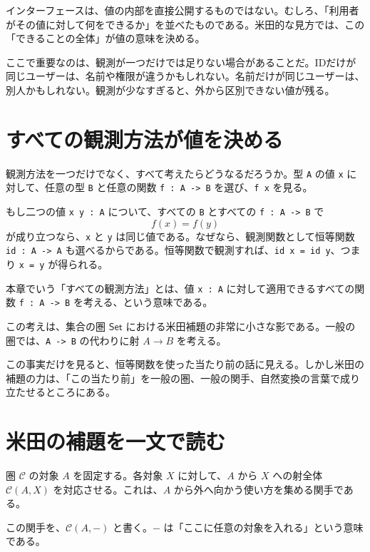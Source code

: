 \begin{softwarebox}
インターフェースは、値の内部を直接公開するものではない。むしろ、「利用者がその値に対して何をできるか」を並べたものである。米田的な見方では、この「できることの全体」が値の意味を決める。
\end{softwarebox}

ここで重要なのは、観測が一つだけでは足りない場合があることだ。IDだけが同じユーザーは、名前や権限が違うかもしれない。名前だけが同じユーザーは、別人かもしれない。観測が少なすぎると、外から区別できない値が残る。

\section{すべての観測方法が値を決める}

観測方法を一つだけでなく、すべて考えたらどうなるだろうか。型 \texttt{A} の値 \texttt{x} に対して、任意の型 \texttt{B} と任意の関数 \texttt{f : A -> B} を選び、\texttt{f x} を見る。

もし二つの値 \texttt{x y : A} について、すべての \texttt{B} とすべての \texttt{f : A -> B} で
\[
  f(x) = f(y)
\]
が成り立つなら、\texttt{x} と \texttt{y} は同じ値である。なぜなら、観測関数として恒等関数 \texttt{id : A -> A} も選べるからである。恒等関数で観測すれば、\texttt{id x = id y}、つまり \texttt{x = y} が得られる。

\begin{definitionbox}
本章でいう「すべての観測方法」とは、値 \texttt{x : A} に対して適用できるすべての関数 \texttt{f : A -> B} を考える、という意味である。

この考えは、集合の圏 \(\mathsf{Set}\) における米田補題の非常に小さな影である。一般の圏では、\texttt{A -> B} の代わりに射 \(A \to B\) を考える。
\end{definitionbox}

この事実だけを見ると、恒等関数を使った当たり前の話に見える。しかし米田の補題の力は、「この当たり前」を一般の圏、一般の関手、自然変換の言葉で成り立たせるところにある。

\section{米田の補題を一文で読む}

圏 \(\mathcal{C}\) の対象 \(A\) を固定する。各対象 \(X\) に対して、\(A\) から \(X\) への射全体 \(\mathcal{C}(A,X)\) を対応させる。これは、\(A\) から外へ向かう使い方を集める関手である。

この関手を、\(\mathcal{C}(A,-)\) と書く。\(-\) は「ここに任意の対象を入れる」という意味である。

